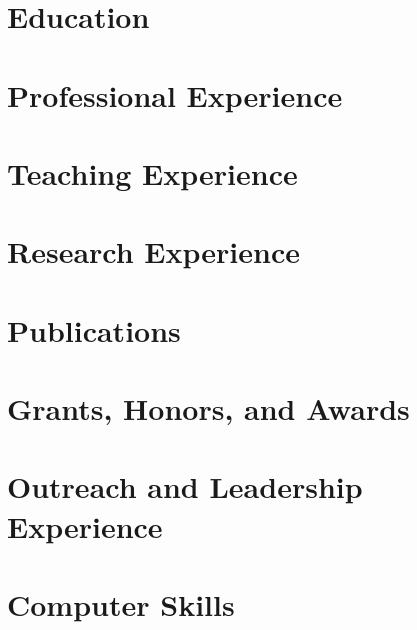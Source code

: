 \documentclass[11pt,letterpaper,sans]{moderncv}
\begin{document}
    \makecvtitle

\section{Education}
    
    

\section{Professional Experience}
    
    
    

\section{Teaching Experience}
    
    
    
    
    

\section{Research Experience}
    
    

\section{Publications}
    
    

\section{Grants, Honors, and Awards}
    

\section{Outreach and Leadership Experience}
    

\section{Computer Skills}
    
\end{document}
